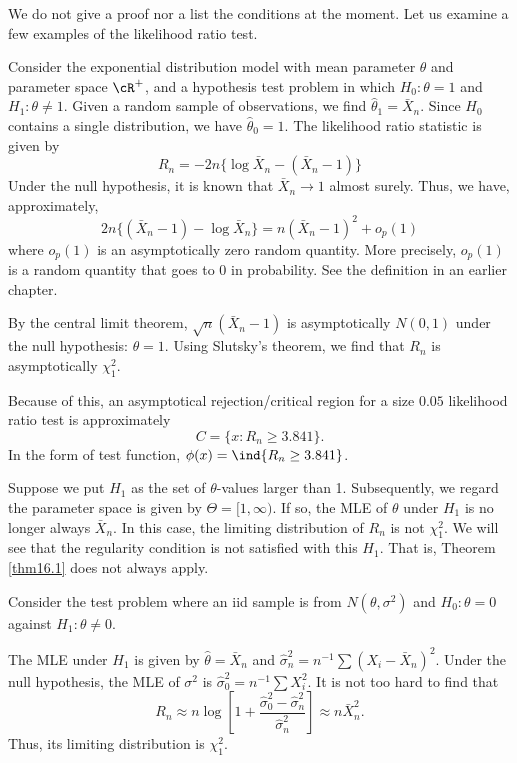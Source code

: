We  do not give a proof nor a list the conditions at the moment.
Let us examine a few examples of the likelihood ratio test.

\begin{example}
Consider the exponential distribution model with mean parameter
$\theta$ and parameter space $\cR^+$, and a hypothesis
test problem in which
$H_0: \theta = 1$ and $H_1: \theta \neq 1$.
Given a random sample of observations, 
we find $\hat \theta_1 = \bar X_n$.
Since $H_0$ contains a single distribution, we have $\hat \theta_0 = 1$.
The likelihood ratio statistic is given by
\[
R_n = - 2 n \{ \log \bar X_n  - (\bar X_n - 1) \}
\]
Under the null hypothesis, it is known that
$\bar X_n \to 1$ almost surely. Thus, we have, approximately,
\[
2 n \{ (\bar X_n - 1) - \log \bar X_n\}
= n (\bar X_n - 1)^2 + o_p(1)
\]
where $o_p(1)$ is an asymptotically zero random quantity.
More precisely, $o_p(1)$ is a random quantity that goes to 0 in probability.
See the definition in an earlier chapter.

By the central limit theorem, $\sqrt{n} (\bar X_n - 1)$ is asymptotically $N(0, 1)$
under the null hypothesis: $\theta = 1$.
Using Slutsky's theorem,
we find that $R_n$ is asymptotically $\chi_1^2$.

Because of this, an asymptotical rejection/critical region for a size $0.05$
likelihood ratio test is approximately
\[
C = \{x:  R_n \geq 3.841 \}.
\]
In the form of test function, $\phi(x) = \ind \{ R_n \geq 3.841 \}$.
\end{example}

Suppose we put $H_1$ as the set of $\theta$-values larger than 1.
Subsequently, we regard the parameter space is 
given by $\Theta = [1, \infty)$.
If so, the MLE of $\theta$ under $H_1$ is no longer always $\bar X_n$.
In this case, the limiting distribution of $R_n$ is not $\chi_1^2$.
We will see that the regularity condition is not satisfied with this $H_1$.
That is,  Theorem \ref{thm16.1} does not always apply.

\begin{example} 
Consider the test problem where an iid sample is from
$N(\theta, \sigma^2)$ and $H_0: \theta = 0$ against $H_1: \theta \neq 0$.

The MLE under $H_1$ is given by $\hat \theta = \bar X_n$
and $\hat \sigma_n^2 = n^{-1} \sum (X_i - \bar X_n)^2$.
Under the null hypothesis, the MLE of $\sigma^2$ is
$\hat \sigma_0^2 = n^{-1} \sum X_i^2$.
It is not too hard to find that
\[
R_n
\approx 
n \log \left [ 1 + \frac{\hat \sigma_0^2 - \hat \sigma_n^2}{\hat \sigma_n^2} \right ]
\approx 
n \bar X_n^2.
\]
Thus, its limiting distribution is $\chi_1^2$.
\end{example}

